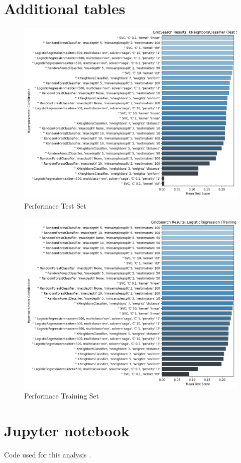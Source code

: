 \documentclass{article}
\begin{document}
\section{Additional tables}

\begin{figure}[H] %
    \centering
    \includegraphics[width=.7
    \linewidth]{TestSet.png}
    \caption{Performace Test Set}
    \label{fig:disease_distribution}
    \vspace{-1em} %
\end{figure}

\begin{figure}[H] %
    \centering
    \includegraphics[width=.7
    \linewidth]{TrainingSet.png}
    \caption{Performace Training Set}
    \label{fig:disease_distribution}
    \vspace{-1em} %
\end{figure}

\section{Jupyter notebook}
Code used for this analysis \cite{arath2024clustering}.

\label{sec:appendix}


\end{document}

